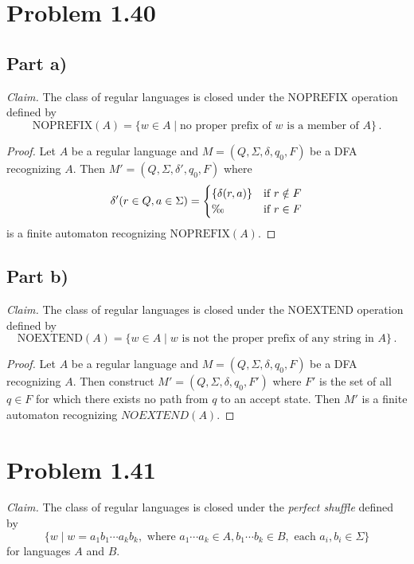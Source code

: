 \documentclass{abrice}
\begin{document}
\section{Problem 1.40}

\subsection{Part a)}

\emph{Claim.} The class of regular languages is closed under the
$\text{NOPREFIX}$ operation defined by
\[
  \text{NOPREFIX}(A) = \{ w \in A \mid \text{no proper prefix of } w \text{ is a
  member of } A\}\, .
\]

\begin{proof}
  Let $A$ be a regular language and $M = (Q, \Sigma, \delta, q_0, F)$ be a DFA
  recognizing $A$. Then $M' = (Q, \Sigma, \delta', q_0, F)$ where
  \[
    \delta'(r \in Q, a \in \Sigma) =
    \begin{cases}
      \{\delta(r,a)\} & \text{if } r \notin F \\
      \O & \text{if } r \in F
    \end{cases}
  \]
  is a finite automaton recognizing $\text{NOPREFIX}(A)$.
\end{proof}

\subsection{Part b)}

\emph{Claim.} The class of regular languages is closed under the
$\text{NOEXTEND}$ operation defined by
\[
  \text{NOEXTEND}(A) = \{ w \in A \mid w \text{ is not the proper prefix of any
    string in } A\}\, .
\]

\begin{proof}
  Let $A$ be a regular language and $M = (Q, \Sigma, \delta, q_0, F)$ be a DFA
  recognizing $A$. Then construct $M' = (Q, \Sigma, \delta, q_0, F')$ where $F'$
  is the set of all $q \in F$ for which there exists no path from $q$ to an
  accept state. Then $M'$ is a finite automaton recognizing $NOEXTEND(A)$.
\end{proof}

\section{Problem 1.41}
\textit{Claim.} The class of regular languages is closed under the \textit{perfect
shuffle} defined by
\[ \{ w \mid w = a_1b_1 \cdots a_k b_k, \text{ where } a_1
\cdots a_k \in A, b_1 \cdots b_k \in B, \text{ each } a_i, b_i \in \Sigma \} \]
for languages $A$ and $B$.
\end{document}

